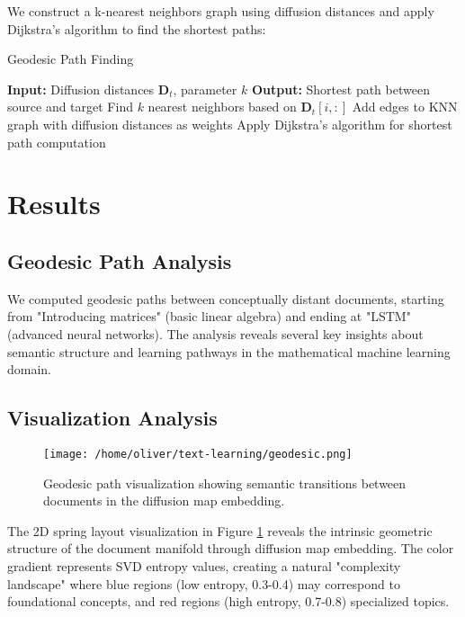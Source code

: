\documentclass[12pt,a4paper]{article}
\begin{document}
We construct a k-nearest neighbors graph using diffusion distances and apply Dijkstra's algorithm \cite{djikstra} to find the shortest paths:

\begin{algorithm}
\caption{Geodesic Path Finding}
\begin{algorithmic}
\STATE \textbf{Input:} Diffusion distances $\mathbf{D}_t$, parameter $k$
\STATE \textbf{Output:} Shortest path between source and target
    \STATE Find $k$ nearest neighbors based on $\mathbf{D}_t[i,:]$
    \STATE Add edges to KNN graph with diffusion distances as weights
\ENDFOR
\STATE Apply Dijkstra's algorithm for shortest path computation
\end{algorithmic}
\end{algorithm}

\section{Results}

\subsection{Geodesic Path Analysis}

We computed geodesic paths between conceptually distant documents, starting from "Introducing matrices" (basic linear algebra) and ending at "LSTM" (advanced neural networks). The analysis reveals several key insights about semantic structure and learning pathways in the mathematical machine learning domain.

\subsection{Visualization Analysis}

\begin{figure}[H]
\centering
\texttt{[image: /home/oliver/text-learning/geodesic.png]}
\caption{Geodesic path visualization showing semantic transitions between documents in the diffusion map embedding.}
\label{fig:geodesic}
\end{figure}

The 2D spring layout \cite{spring-layout} visualization in Figure \ref{fig:geodesic} reveals the intrinsic geometric structure of the document manifold through diffusion map embedding. The color gradient represents SVD entropy values, creating a natural "complexity landscape" where blue regions (low entropy, 0.3-0.4) may correspond to foundational concepts, and red regions (high entropy, 0.7-0.8) specialized topics.
\end{document}
